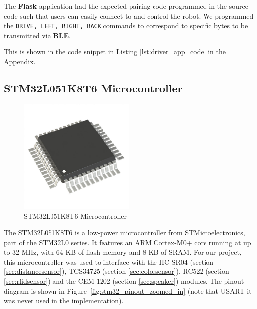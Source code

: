 \documentclass{article}
\begin{document}
\begin{minipage}{\linewidth}
    The \textbf{Flask} application had the expected pairing code programmed in the source code such that users can easily connect to and control the robot.
    We programmed the \texttt{DRIVE, LEFT, RIGHT, BACK} commands to correspond to specific bytes to be transmitted via \textbf{BLE}. \\
\end{minipage}

\begin{center}
    This is shown in the code snippet in Listing \ref{lst:driver_app_code} in the Appendix.
\end{center}

\subsection{STM32L051K8T6 Microcontroller}
\label{sec:stm32}

\begin{figure}[H]
    \centering
    \includegraphics[width=0.5\textwidth]{Figures/stm32.jpg} %
    \caption{STM32L051K8T6 Microcontroller}
    \label{fig:stm32}
\end{figure}

The STM32L051K8T6 is a low-power microcontroller from STMicroelectronics, part of the STM32L0 series. It features an ARM Cortex-M0+ core running at up to 32 MHz, with 64 KB of flash memory and 8 KB of SRAM. For our project, this microcontroller was used to interface with the HC-SR04 (section \ref{sec:distancesensor}), TCS34725 (section \ref{sec:colorsensor}), RC522 (section \ref{sec:rfidsensor}) and the CEM-1202 (section \ref{sec:speaker}) modules. The pinout diagram is shown in Figure~\ref{fig:stm32_pinout_zoomed_in} (note that USART it was never used in the implementation).
\end{document}
